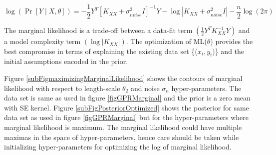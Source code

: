   \begin{equation}\label{eqExactNLML}
\log(\Pr [Y \mid X, \theta ]) = -\frac{1}{2}Y^{T}[K_{XX}+ \sigma_{noise}^{2}I]^{-1}Y - \log\left |  K_{XX}+ \sigma_{noise}^{2}I\right | - \frac{n}{2}\log(2\pi)
  \end{equation}
  
The marginal likelihood is a trade-off between a data-fit term \((\frac{1}{2}Y^{T}K_{XX}^{-1}Y)\) and a model complexity term \((\log\left |  K_{XX}\right |)\). The optimization of ML(\(\theta\)) provides the best compromise in terms of explaining the existing data set \{(\(x_{i}, y_{i}\))\} and the initial assumptions encoded in the prior. 

Figure \ref{subFigmaximizingMarginalLikelihood} shows the contours of marginal likelihood with respect to length-scale \(\theta_{2}\) and noise \(\sigma_{n}\) hyper-parameters. The data set is same as used in figure \ref{figGPRMarginal} and the prior is a zero mean with SE kernel. Figure \ref{subFigPosteriorOptimized} shows the posterior for same data set as used in figure \ref{figGPRMarginal} but for the hyper-parameters where marginal likelihood is maximum. The marginal likelihood could have multiple maximas in the space of hyper-parameters, hence care should be taken while initializing hyper-parameters for optimizing the log of marginal likelihood. 


